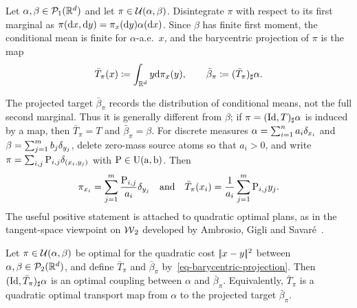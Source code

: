\begin{defn}\label{def-barycentric-projection}
	Let $\alpha,\beta\in\mathcal{P}_1(\mathbb{R}^d)$ and let $\pi\in\mathcal{U}(\alpha,\beta)$. Disintegrate $\pi$ with respect to its first marginal as
	$\pi(\mathrm{d} x,\mathrm{d} y)=\pi_x(\mathrm{d} y)\alpha(\mathrm{d} x)$. Since $\beta$ has finite first moment, the conditional mean is finite for $\alpha$-a.e.\ $x$, and the barycentric projection of $\pi$ is the map
	\begin{equation}\label{eq-barycentric-projection}
		\bar T_\pi(x)
		\coloneqq
		\int_{\mathbb{R}^d}y\mathrm{d}\pi_x(y),
		\qquad
		\bar\beta_\pi
		\coloneqq
		(\bar T_\pi)_\sharp\alpha.
	\end{equation}
\end{defn}
The projected target $\bar\beta_\pi$ records the distribution of conditional means, not the full second marginal. Thus it is generally different from $\beta$; if $\pi=(\mathrm{Id},T)_\sharp\alpha$ is induced by a map, then $\bar T_\pi=T$ and $\bar\beta_\pi=\beta$. For discrete measures $\alpha=\sum_{i=1}^n a_i\delta_{x_i}$ and $\beta=\sum_{j=1}^m b_j\delta_{y_j}$, delete zero-mass source atoms so that $a_i>0$, and write $\pi=\sum_{i,j}\mathrm{P}_{i,j}\delta_{(x_i,y_j)}$ with $\mathrm{P}\in\mathrm{U}(\mathrm{a},\mathrm{b})$. Then
\[
	\pi_{x_i}=\sum_{j=1}^m\frac{\mathrm{P}_{i,j}}{a_i}\delta_{y_j}
	\quad \text{and} \quad
	\bar T_\pi(x_i)=\frac{1}{a_i}\sum_{j=1}^m\mathrm{P}_{i,j}y_j.
\]
The useful positive statement is attached to quadratic optimal plans, as in the tangent-space viewpoint on $\operatorname{\mathcal{W}}_2$ developed by Ambrosio, Gigli and Savar{\'e}~\cite[Chap.~7]{ambrosio2006gradient}.

\begin{prop}\label{prop-barycentric-projection-optimal}
	Let $\pi\in\mathcal{U}(\alpha,\beta)$ be optimal for the quadratic cost $|\!| x-y |\!|^2$ between $\alpha,\beta\in\mathcal{P}_2(\mathbb{R}^d)$, and define $\bar T_\pi$ and $\bar\beta_\pi$ by~\eqref{eq-barycentric-projection}. Then $(\mathrm{Id},\bar T_\pi)_\sharp\alpha$ is an optimal coupling between $\alpha$ and $\bar\beta_\pi$. Equivalently, $\bar T_\pi$ is a quadratic optimal transport map from $\alpha$ to the projected target $\bar\beta_\pi$.
\end{prop}

